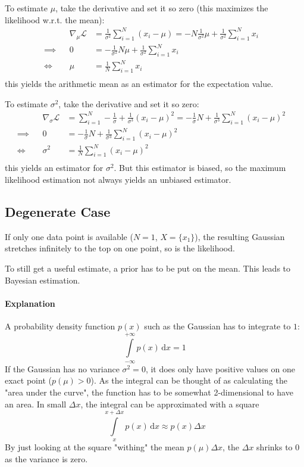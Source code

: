 \documentclass[a4paper, 11pt, accentcolor = tud3b]{tudreport}
\newcommand{\dif}[1]{\ensuremath{\,\mathrm{d}#1}}
\begin{document}
					To estimate \(\mu\), take the derivative and set it so zero (this maximizes the likelihood w.r.t. the mean):
					\begin{align}
						&& \nabla_\mu \mathcal{L} &= \frac{1}{\sigma^2} \sum_{i = 1}^{N} (x_i - \mu) = -N\frac{1}{\sigma^2}\mu + \frac{1}{\sigma^2} \sum_{i = 1}^{N} x_i & \\
						\implies && 0 &= -\frac{1}{\sigma^2}N\mu + \frac{1}{\sigma^2} \sum_{i = 1}^{N} x_i & \\
						\iff && \mu &= \frac{1}{N} \sum_{i = 1}^{N} x_i  & \\
					\end{align}
					this yields the arithmetic mean as an estimator for the expectation value.

					To estimate \(\sigma^2\), take the derivative and set it so zero:
					\begin{align}
						&& \nabla_{\sigma} \mathcal{L} &= \sum_{i = 1}^{N} -\frac{1}{\sigma} + \frac{1}{\sigma^3} (x_i - \mu)^2 = -\frac{1}{\sigma}N + \frac{1}{\sigma^3} \sum_{i = 1}^{N} (x_i - \mu)^2 & \\
						\implies && 0 &= -\frac{1}{\sigma}N + \frac{1}{\sigma^3} \sum_{i = 1}^{N} (x_i - \mu)^2 & \\
						\iff && \sigma^2 &= \frac{1}{N} \sum_{i = 1}^{N} (x_i - \mu)^2 & \\
					\end{align}
					this yields an estimator for \(\sigma^2\). But this estimator is biased, so the maximum likelihood estimation not always yields an unbiased estimator.

			\subsection{Degenerate Case}
				If only one data point is available (\( N = 1 \), \( X = \{ x_1 \} \)), the resulting Gaussian stretches infinitely to the top on one point, so is the likelihood.

				To still get a useful estimate, a prior has to be put on the mean. This leads to Bayesian estimation.

				\paragraph{Explanation}
					A probability density function \( p(x) \) such as the Gaussian has to integrate to \(1\):
					\begin{equation}
						\int\limits_{-\infty}^{+\infty} p(x) \dif{x} = 1
					\end{equation}
					If the Gaussian has no variance \( \sigma^2 = 0 \), it does only have positive values on one exact point (\( p(\mu) > 0 \)). As the integral can be thought of as calculating the "area under the curve", the function has to be somewhat 2-dimensional to have an area. In small \( \Delta x \), the integral can be approximated with a square
					\begin{equation}
						\int\limits_{x}^{x + \Delta x} p(x) \dif{x} \approx p(x) \Delta x
					\end{equation}
					By just looking at the square "withing" the mean \( p(\mu) \Delta x \), the \(\Delta x\) shrinks to \(0\) as the variance is zero.
\end{document}
